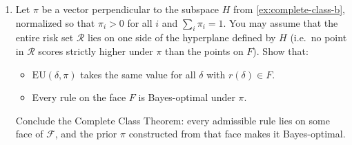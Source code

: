 \documentclass[11pt]{article}
\begin{document}
\begin{exercise}
\begin{enumerate}
\item \label{ex:complete-class-c} Let $\pi$ be a vector perpendicular to the subspace $H$ from
\cref{ex:complete-class-b}, normalized so that $\pi_i > 0$ for all $i$ and $\sum_i \pi_i = 1$. You may
assume that the entire risk set $\mathcal{R}$ lies on one side of the hyperplane
defined by $H$ (i.e.\ no point in $\mathcal{R}$ scores strictly higher under $\pi$
than the points on $F$). Show that:
\begin{itemize}
  \item[(i)] $\mathrm{EU}(\delta, \pi)$ takes the same value for all $\delta$ with
    $r(\delta) \in F$.
  \item[(ii)] Every rule on the face $F$ is Bayes-optimal under $\pi$.
\end{itemize}
Conclude the Complete Class Theorem: every admissible rule lies on some face of
$\mathcal{F}$, and the prior $\pi$ constructed from that face makes it Bayes-optimal.
\end{enumerate}
\end{exercise}
\end{document}
